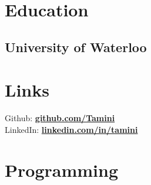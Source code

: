 \documentclass[letterpaper]{deedy-resume-modified} %
\begin{document}


\begin{minipage}[t]{0.32\textwidth} %


\section{Education} 

\subsection{University of Waterloo}


\sectionspace %


\section{Links} 

Github: \href{https://github.com/Tamini}{\bf github.com/Tamini} \\
LinkedIn: \href{https://www.linkedin.com/in/tamini}{\bf linkedin.com/in/tamini} \\

\sectionspace %


\section{Programming}


\end{minipage}
\end{document}
